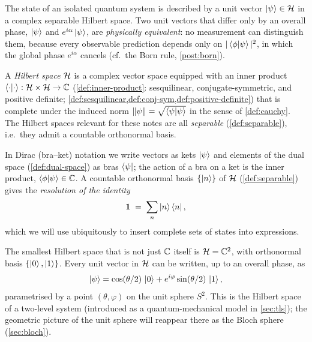 \begin{postulate}
\label{post:states}
The state of an isolated quantum system is described by a unit
vector $\ket{\psi}\in\mathcal{H}$ in a complex separable Hilbert space.
Two unit vectors that differ only by an overall phase, $\ket{\psi}$
and $e^{i\alpha}\ket{\psi}$, are \emph{physically equivalent}: no
measurement can distinguish them, because every observable
prediction depends only on $|\braket{\phi}{\psi}|^2$, in which the
global phase $e^{i\alpha}$ cancels (cf.\ the Born rule,
\cref{post:born}).
\end{postulate}

\begin{definition}
\label{def:hilbert}
A \emph{Hilbert space} $\mathcal{H}$ is a complex vector space equipped
with an inner product
$\braket{\cdot}{\cdot}:\mathcal{H}\times\mathcal{H}\to\mathbb{C}$
(\cref{def:inner-product}: sesquilinear, conjugate-symmetric, and
positive definite; \cref{def:sesquilinear,def:conj-sym,def:positive-definite})
that is complete under the induced norm
$\|\psi\|=\sqrt{\braket{\psi}{\psi}}$ in the sense of
\cref{def:cauchy}. The Hilbert spaces relevant for these notes are
all \emph{separable} (\cref{def:separable}), i.e.\ they admit a
countable orthonormal basis.
\end{definition}

In Dirac (bra--ket) notation we write vectors as kets $\ket{\psi}$
and elements of the dual space (\cref{def:dual-space}) as bras
$\bra{\psi}$; the action of a bra on a ket is the inner product,
$\braket{\phi}{\psi}\in\mathbb{C}$. A countable orthonormal basis
$\{\ket{n}\}$ of $\mathcal{H}$ (\cref{def:separable}) gives the
\emph{resolution of the identity}
\begin{equation}
\label{eq:resolution-identity}
\mathbf{1} \;=\; \sum_{n} \ket{n}\bra{n},
\end{equation}
which we will use ubiquitously to insert complete sets of states into
expressions.

\begin{example}
The smallest Hilbert space that is not just $\mathbb{C}$ itself is
$\mathcal{H}=\mathbb{C}^2$, with orthonormal basis $\{\ket{0},\ket{1}\}$.
Every unit vector in $\mathcal{H}$ can be written, up to an overall
phase, as
\begin{equation}
\ket{\psi} = \cos(\theta/2)\,\ket{0} + e^{i\varphi}\sin(\theta/2)\,\ket{1},
\end{equation}
parametrised by a point $(\theta,\varphi)$ on the unit sphere $S^2$.
This is the Hilbert space of a two-level system (introduced as a
quantum-mechanical model in \cref{sec:tls}); the geometric picture
of the unit sphere will reappear there as the Bloch sphere
(\cref{sec:bloch}).
\end{example}

